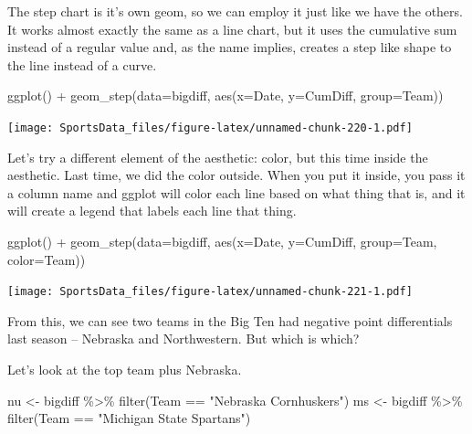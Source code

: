 \documentclass[
]{book}
\newenvironment{Shaded}{\begin{snugshade}}{\end{snugshade}}
\newcommand{\AttributeTok}[1]{\textcolor[rgb]{0.77,0.63,0.00}{#1}}
\newcommand{\FunctionTok}[1]{\textcolor[rgb]{0.00,0.00,0.00}{#1}}
\newcommand{\NormalTok}[1]{#1}
\newcommand{\OtherTok}[1]{\textcolor[rgb]{0.56,0.35,0.01}{#1}}
\newcommand{\SpecialCharTok}[1]{\textcolor[rgb]{0.00,0.00,0.00}{#1}}
\newcommand{\StringTok}[1]{\textcolor[rgb]{0.31,0.60,0.02}{#1}}
\begin{document}
The step chart is it's own geom, so we can employ it just like we have the others. It works almost exactly the same as a line chart, but it uses the cumulative sum instead of a regular value and, as the name implies, creates a step like shape to the line instead of a curve.

\begin{Shaded}
\begin{Highlighting}[]
\FunctionTok{ggplot}\NormalTok{() }\SpecialCharTok{+} \FunctionTok{geom\_step}\NormalTok{(}\AttributeTok{data=}\NormalTok{bigdiff, }\FunctionTok{aes}\NormalTok{(}\AttributeTok{x=}\NormalTok{Date, }\AttributeTok{y=}\NormalTok{CumDiff, }\AttributeTok{group=}\NormalTok{Team))}
\end{Highlighting}
\end{Shaded}

\texttt{[image: SportsData\_files/figure-latex/unnamed-chunk-220-1.pdf]}

Let's try a different element of the aesthetic: color, but this time inside the aesthetic. Last time, we did the color outside. When you put it inside, you pass it a column name and ggplot will color each line based on what thing that is, and it will create a legend that labels each line that thing.

\begin{Shaded}
\begin{Highlighting}[]
\FunctionTok{ggplot}\NormalTok{() }\SpecialCharTok{+} \FunctionTok{geom\_step}\NormalTok{(}\AttributeTok{data=}\NormalTok{bigdiff, }\FunctionTok{aes}\NormalTok{(}\AttributeTok{x=}\NormalTok{Date, }\AttributeTok{y=}\NormalTok{CumDiff, }\AttributeTok{group=}\NormalTok{Team, }\AttributeTok{color=}\NormalTok{Team))}
\end{Highlighting}
\end{Shaded}

\texttt{[image: SportsData\_files/figure-latex/unnamed-chunk-221-1.pdf]}

From this, we can see two teams in the Big Ten had negative point differentials last season -- Nebraska and Northwestern. But which is which?

Let's look at the top team plus Nebraska.

\begin{Shaded}
\begin{Highlighting}[]
\NormalTok{nu }\OtherTok{\textless{}{-}}\NormalTok{ bigdiff }\SpecialCharTok{\%\textgreater{}\%} \FunctionTok{filter}\NormalTok{(Team }\SpecialCharTok{==} \StringTok{"Nebraska Cornhuskers"}\NormalTok{)}
\NormalTok{ms }\OtherTok{\textless{}{-}}\NormalTok{ bigdiff }\SpecialCharTok{\%\textgreater{}\%} \FunctionTok{filter}\NormalTok{(Team }\SpecialCharTok{==} \StringTok{"Michigan State Spartans"}\NormalTok{)}
\end{Highlighting}
\end{Shaded}
\end{document}
